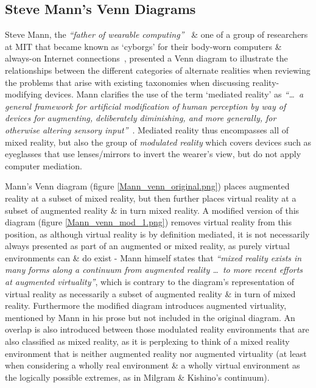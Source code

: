 \subsection{Steve Mann's Venn Diagrams}
\label{stevemannvenn}
Steve Mann, the \textit{``father of wearable computing''}~\cite{Schofield2012} \& one of a group of researchers at MIT that became known as `cyborgs' for their body-worn computers \& always-on Internet connections~\cite{Turkle2011}, presented a Venn diagram to illustrate the relationships between the different categories of alternate realities when reviewing the problems that arise with existing taxonomies when discussing reality-modifying devices. Mann clarifies the use of the term `mediated reality' as \textit{``\ldots\ a general framework for artificial modification of human perception by way of devices for augmenting, deliberately diminishing, and more generally, for otherwise altering sensory input''}~\cite{Mann2002a}. Mediated reality thus encompasses all of mixed reality, but also the group of \textit{modulated reality} which covers devices such as eyeglasses that use lenses/mirrors to invert the wearer's view, but do not apply computer mediation.


Mann's Venn diagram (figure \ref{Mann_venn_original.png}) places augmented reality at a subset of mixed reality, but then further places virtual reality at a subset of augmented reality \& in turn mixed reality. A modified version of this diagram (figure \ref{Mann_venn_mod_1.png}) removes virtual reality from this position, as although virtual reality is by definition mediated, it is not necessarily always presented as part of an augmented or mixed reality, as purely virtual environments can \& do exist - Mann himself states that \textit{``mixed reality exists in many forms along a continuum from augmented reality \ldots\ to more recent efforts at augmented virtuality''}, which is contrary to the diagram's representation of virtual reality as necessarily a subset of augmented reality \& in turn of mixed reality. Furthermore the modified diagram introduces augmented virtuality, mentioned by Mann in his prose but not included in the original diagram. An overlap is also introduced between those modulated reality environments that are also classified as mixed reality, as it is perplexing to think of a mixed reality environment that is neither augmented reality nor augmented virtuality (at least when considering a wholly real environment \& a wholly virtual environment as the logically possible extremes, as in Milgram \& Kishino's continuum).

